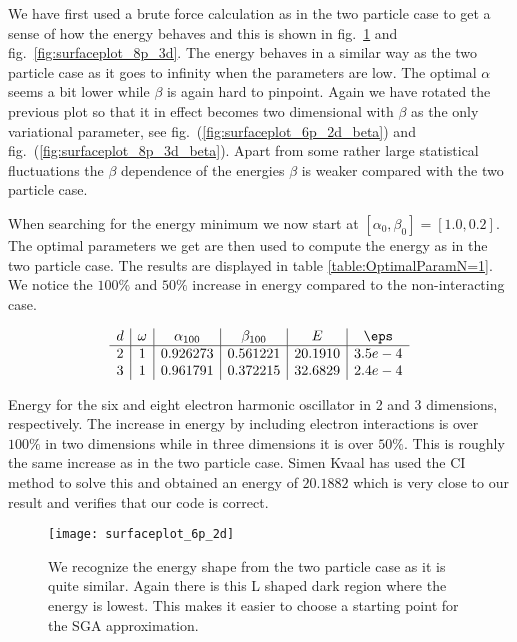 We have first used a brute force calculation as in the two particle case to get a sense of how the energy behaves and this is shown in fig.~\ref{fig:surfaceplot_6p_2d} and fig.~\ref{fig:surfaceplot_8p_3d}. The energy behaves in a similar way as the two particle case as it goes to infinity when the parameters are low. The optimal $\alpha$ seems a bit lower while $\beta$ is again hard to pinpoint. Again we have rotated the previous plot so that it in effect becomes two dimensional with $\beta$ as the only variational parameter, see fig.~(\ref{fig:surfaceplot_6p_2d_beta}) and fig.~(\ref{fig:surfaceplot_8p_3d_beta}). Apart from some rather large statistical fluctuations the $\beta$ dependence of the energies $\beta$ is weaker compared with  the two particle case. 

When searching for the energy minimum we now start at $[\alpha_0,\beta_0]=[1.0,0.2]$. The optimal parameters we get are then used to compute the energy as in the two particle case. The results are displayed in table \ref{table:OptimalParamN=1}. We notice the $100\%$ and $50\%$ increase in energy compared to the non-interacting case.  
\begin{table}[!h]
  \centering
  \[
  \begin{array}{c|c|c|c|c|c}
    d&\omega&\alpha_{100}&\beta_{100}&E&\eps\\
    \hline
    2&1&0.926273&0.561221&20.1910& 3.5e-4\\
    3&1&0.961791&0.372215&32.6829& 2.4e-4\\
  \end{array}
\]
\caption{Energy for the six and eight electron harmonic oscillator in 2 and 3 dimensions, respectively. The increase in energy by including electron interactions is over $100\%$ in two dimensions while in three dimensions it is over $50\%$. This is roughly the same increase as in the two particle case. Simen Kvaal \cite{phd:simen} has used the CI method to solve this and obtained an energy of $20.1882$ which is very close to our result and verifies that our code is correct.} 
\label{table:OptimalParamN=1}
\end{table}

\begin{figure}[!p]
  \begin{center}
    \texttt{[image: surfaceplot\_6p\_2d]}
  \end{center}
  \caption{We recognize the energy shape from the two particle case as it is quite similar. Again there is this L shaped dark region where the energy is lowest. This makes it easier to choose a starting point for the SGA approximation.}
  \label{fig:surfaceplot_6p_2d}
\end{figure}




